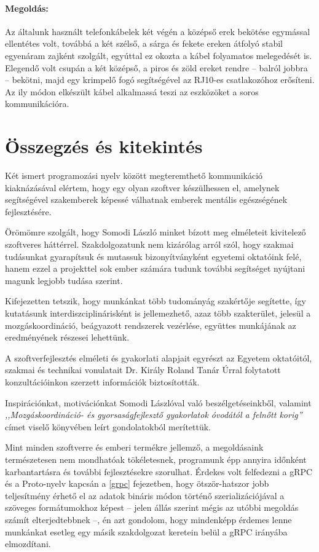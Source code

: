 \documentclass[tocnopagenum]{thesis-ekf}
\theoremstyle{definition}
\theoremstyle{remark}
\begin{document}
	\subsubsection{Megoldás:} Az általunk használt telefonkábelek két végén a középső erek bekötése egymással ellentétes volt, továbbá a két szélső, a sárga és fekete ereken átfolyó stabil egyenáram zajként szolgált, egyúttal ez okozta a kábel folyamatos melegedését is. Elegendő volt csupán a két középső, a piros és zöld ereket rendre -- balról jobbra --  bekötni, majd egy krimpelő fogó segítségével az RJ10-es csatlakozóhoz erősíteni. Az ily módon elkészült kábel alkalmassá teszi az eszközöket a soros kommunikációra.
	
	\chapter*{Összegzés és kitekintés}
	Két ismert programozási nyelv között megteremthető kommunikáció kiaknázásával elértem, hogy egy olyan szoftver készülhessen el, amelynek segítségével szakemberek képessé válhatnak emberek mentális egészségének fejlesztésére. 
	
	Örömömre szolgált, hogy Somodi László minket bízott meg elméleteit kivitelező szoftveres háttérrel. Szakdolgozatunk nem kizárólag arról szól, hogy szakmai tudásunkat gyarapítsuk és mutassuk bizonyítványként egyetemi oktatóink felé, hanem ezzel a projekttel sok ember számára tudunk további segítséget nyújtani magunk legjobb tudása szerint.
	
	Kifejezetten tetszik, hogy munkánkat több tudományág szakértője segítette, így kutatásunk interdiszciplinárisként is jellemezhető, azaz több szakterület, jelesül a mozgáskoordináció, beágyazott rendszerek vezérlése, együttes munkájának az eredményének részesei lehettünk.
	
	A szoftverfejlesztés elméleti és gyakorlati alapjait egyrészt az Egyetem oktatóitól, szakmai és technikai vonulatait Dr. Király Roland Tanár Úrral folytatott konzultációinkon szerzett információk biztosították. 
	
	Inspirációnkat, motivációnkat Somodi Lászlóval való beszélgetéseinkből, valamint \textit{,,Mozgáskoordináció- és gyorsaságfejlesztő gyakorlatok óvodától a felnőtt korig''} címet viselő könyvében leírt gondolatokból merítettük.
	
	Mint minden szoftverre és emberi termékre jellemző, a megoldásaink természetesen nem mondhatóak tökéletesnek, programunk épp annyira időnként karbantartásra és további fejlesztésekre szorulhat. Érdekes volt felfedezni a gRPC és a Proto-nyelv kapcsán a \ref{grpc} fejezetben, hogy ötször-hatszor jobb teljesítmény érhető el az adatok bináris módon történő szerializációjával a szöveges formátumokhoz képest -- jelen állás szerint mégis az utóbbi megoldás számít elterjedtebbnek --, én azt gondolom, hogy mindenképp érdemes lenne munkánkat esetleg egy másik szakdolgozat keretein belül a gRPC irányába elmozdítani.
\end{document}
